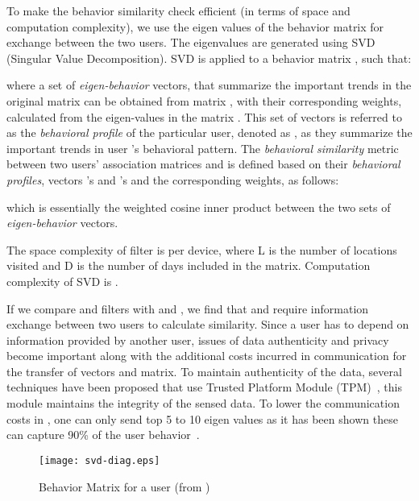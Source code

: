 \documentclass[10pt,conference]{IEEEtran}
\begin{document}
To make the behavior similarity check  efficient (in terms of space and computation complexity), we use the eigen values of the behavior matrix for exchange between the two users. The eigenvalues are generated using SVD (Singular Value Decomposition). SVD is applied to a behavior matrix , such that:


where a set of {\it eigen-behavior} vectors,   that summarize the important trends in the original matrix  can be obtained from matrix , with their corresponding weights,  calculated from the eigen-values in the matrix .  This set of vectors is referred to as the {\it behavioral profile} of the particular user, denoted as , as they summarize the important trends in user 's behavioral pattern. The {\it behavioral similarity} metric between two users' association matrices  and  is defined based on their {\it behavioral profiles}, vectors 's and 's and the corresponding weights, as follows: 

which is essentially the weighted cosine inner product between the two sets of {\it eigen-behavior} vectors.


The space complexity of  filter is  per device, where L is the number of locations visited and D is the number of days included in the matrix.  Computation complexity of SVD is .





If we compare  and  filters with  and , we find that  and  require information exchange between two users to calculate similarity. Since a user has to depend on information provided by another user, issues of data authenticity and privacy become important along with the additional costs incurred in communication for the transfer of vectors and matrix. To maintain authenticity of the data, several techniques have been proposed that use  Trusted Platform Module (TPM)~\cite{trustedcomputing,towardstrusted}, this module maintains the integrity of the sensed data. To lower the communication costs in , one can only send top 5 to 10 eigen values as it has been shown these can capture 90\% of the user behavior~\cite{profilecast}.  




\begin{figure}
\centering
\texttt{[image: svd-diag.eps]}

\caption{Behavior Matrix  for a  user (from \cite{profilecast})}
\label{dig:svd}
\end{figure}
\end{document}
